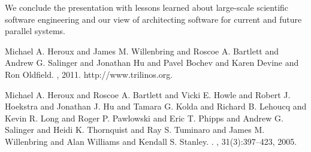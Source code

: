 We conclude the presentation with lessons learned about large-scale scientific software engineering and our view of architecting software for current and future parallel systems.


%
\begin{thebibliography}{1}

{Michael A. Heroux and James M. Willenbring and Roscoe A. Bartlett and Andrew
  G. Salinger and Jonathan Hu and Pavel Bochev and Karen Devine and Ron
  Oldfield}.
, 2011.
\newblock http://www.trilinos.org.

{Michael A. Heroux and Roscoe A. Bartlett and Vicki E. Howle and Robert J.
  Hoekstra and Jonathan J. Hu and Tamara G. Kolda and Richard B. Lehoucq and
  Kevin R. Long and Roger P. Pawlowski and Eric T. Phipps and Andrew G.
  Salinger and Heidi K. Thornquist and Ray S. Tuminaro and James M. Willenbring
  and Alan Williams and Kendall S. Stanley}.
.
, 31(3):397--423, 2005.

\end{thebibliography}

